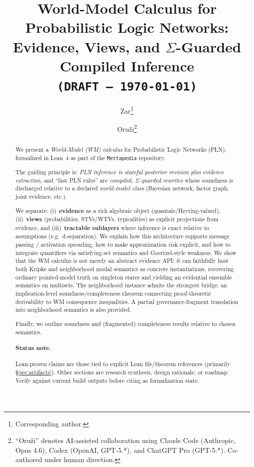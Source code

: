 \documentclass[]{article}
\title{World-Model Calculus for Probabilistic Logic Networks:\\
  Evidence, Views, and $\Sigma$-Guarded Compiled Inference\\
  \texttt{(DRAFT --- \today)}}
\author{Zar\footnote{Corresponding author.}
\and Oru\v{z}i\footnote{``Oru\v{z}i'' denotes AI-assisted collaboration
using Claude Code (Anthropic, Opus 4.6), Codex (OpenAI, GPT-5.*), and
ChatGPT Pro (GPT-5.*). Co-authored under human direction.}}
\newcommand{\code}[1]{\texttt{#1}}
\begin{document}
\maketitle

\begin{abstract}
We present a \emph{World-Model (WM) calculus} for Probabilistic Logic
Networks (PLN), formalized in Lean~4 as part of the \code{Mettapedia}
repository.

The guiding principle is: \emph{PLN inference is stateful posterior revision
plus evidence extraction}, and ``fast PLN rules'' are \emph{compiled,
$\Sigma$-guarded rewrites} whose soundness is discharged relative to a
declared \emph{world-model class} (Bayesian network, factor graph, joint
evidence, etc.).

We separate:
(i)~\textbf{evidence} as a rich algebraic object (quantale/Heyting-valued),
(ii)~\textbf{views} (probabilities, STVs/WTVs, typicalities) as explicit
projections from evidence, and
(iii)~\textbf{tractable sublayers} where inference is exact relative to
assumptions (e.g.\ d-separation).
We explain how this architecture supports message passing / activation
spreading, how to make approximation risk explicit, and how to integrate
quantifiers via satisfying-set semantics and Goertzel-style weakness.
We show that the WM calculus is not merely an abstract evidence API: it
can faithfully host both Kripke and neighborhood modal semantics as
concrete instantiations, recovering ordinary pointed-model truth on
singleton states and yielding an evidential ensemble semantics on
multisets. The neighborhood instance admits the strongest bridge: an
implication-level soundness/completeness theorem connecting proof-theoretic
derivability to WM consequence inequalities. A partial governance-fragment
translation into neighborhood semantics is also provided.

Finally, we outline soundness and (fragmented) completeness results
relative to chosen semantics.

\paragraph{Status note.}
Lean-proven claims are those tied to explicit Lean file/theorem references
(primarily \S\ref{sec:artifacts}). Other sections are research synthesis,
design rationale, or roadmap. Verify against current build outputs before
citing as formalization state.
\end{abstract}

\tableofcontents
\newpage
\end{document}
